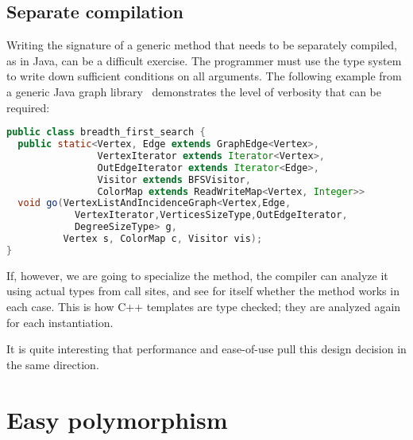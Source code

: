 \iffalse
Parametric polymorphism describes code that works for any object precisely
because it does not do anything meaningful to the object, for example the
identity function. In contrast, programming with tagged data (e.g.
symbolic expression systems, XML) permits code to work for any object
because every object has the same structure, allowing meaningful
operations.
\fi

\subsection{Separate compilation}

Writing the signature of a generic method that needs to be separately compiled,
as in Java, can be a difficult exercise.
The programmer must use the type system to write down sufficient conditions on all
arguments.
The following example from a generic Java graph
library~\cite{Garcia:2003:CSL:949305.949317} demonstrates the level of verbosity
that can be required:

\begin{singlespace}
\begin{lstlisting}[language=java,style=ttcode]
public class breadth_first_search {
  public static<Vertex, Edge extends GraphEdge<Vertex>,
                VertexIterator extends Iterator<Vertex>,
                OutEdgeIterator extends Iterator<Edge>,
                Visitor extends BFSVisitor,
                ColorMap extends ReadWriteMap<Vertex, Integer>>
  void go(VertexListAndIncidenceGraph<Vertex,Edge,
            VertexIterator,VerticesSizeType,OutEdgeIterator,
            DegreeSizeType> g,
          Vertex s, ColorMap c, Visitor vis);
}
\end{lstlisting}
\end{singlespace}


If, however, we are going to specialize the method, the compiler can analyze it
using actual types from call sites, and see for itself whether the method works
in each case.
This is how C++ templates are type checked; they are analyzed again for each
instantiation.

It is quite interesting that performance and ease-of-use pull this design
decision in the same direction.


\section{Easy polymorphism}

